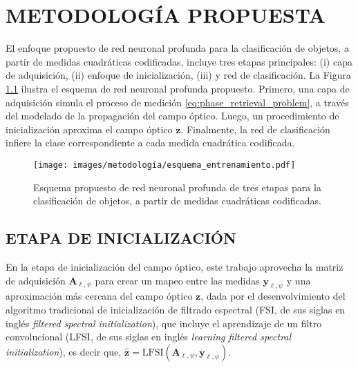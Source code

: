 
\chapter{METODOLOGÍA PROPUESTA}

El enfoque propuesto de red neuronal profunda para la clasificación de objetos, a partir de medidas cuadráticas codificadas, incluye tres etapas principales: (i) capa de adquisición, (ii) enfoque de inicialización, (iii) y red de clasificación. La Figura \ref{fig:esquema_entrenamiento} ilustra el esquema de red neuronal profunda propuesto. Primero, una capa de adquisición simula el proceso de medición \eqref{eq:phase_retrieval_problem}, a través del modelado de la propagación del campo óptico. Luego, un procedimiento de inicialización aproxima el campo óptico $\mathbf{z}$. Finalmente, la red de clasificación infiere la clase correspondiente a cada medida cuadrática codificada.


\begin{figure}[!h]
    \centering
    \caption{Esquema propuesto de red neuronal profunda de tres etapas para la clasificación de objetos, a partir de medidas cuadráticas codificadas.}
    \texttt{[image: images/metodología/esquema\_entrenamiento.pdf]}
    \label{fig:esquema_entrenamiento}
\end{figure}


\section{ETAPA DE INICIALIZACIÓN}

En la etapa de inicialización del campo óptico, este trabajo aprovecha la matriz de adquisición $\mathbf{A}_{\ell, \psi}$ para crear un mapeo entre las medidas $\mathbf{y}_{\ell, \psi}$ y una aproximación más cercana del campo óptico $\mathbf{z}$, dada por el desenvolvimiento del algoritmo tradicional de inicialización de filtrado espectral  (FSI, de sus siglas en inglés \textit{filtered spectral initialization}), que incluye el aprendizaje de un filtro convolucional  (LFSI, de sus siglas en inglés \textit{learning filtered spectral initialization}), es decir que, $\hat{\mathbf{z}}=\mathrm{LFSI}(\mathbf{A}_{\ell, \psi}, \mathbf{y}_{\ell, \psi})$.

